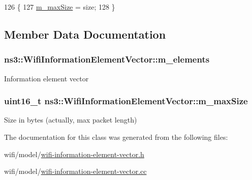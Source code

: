 \begin{DoxyCode}
126 \{
127   \hyperlink{classns3_1_1WifiInformationElementVector_ae4e269048a74f706dc50155295dcd4ad}{m\_maxSize} = size;
128 \}
\end{DoxyCode}


\subsection{Member Data Documentation}
\subsubsection[{\texorpdfstring{m\+\_\+elements}{m_elements}}]{ ns3\+::\+Wifi\+Information\+Element\+Vector\+::m\+\_\+elements\hspace{0.3cm}{\ttfamily [protected]}}\hypertarget{classns3_1_1WifiInformationElementVector_a03bf28a1640272cfa71fdd6e5bbf429e}{}\label{classns3_1_1WifiInformationElementVector_a03bf28a1640272cfa71fdd6e5bbf429e}
Information element vector 
\subsubsection[{\texorpdfstring{m\+\_\+max\+Size}{m_maxSize}}]{\setlength{\rightskip}{0pt plus 5cm}uint16\+\_\+t ns3\+::\+Wifi\+Information\+Element\+Vector\+::m\+\_\+max\+Size\hspace{0.3cm}{\ttfamily [protected]}}\hypertarget{classns3_1_1WifiInformationElementVector_ae4e269048a74f706dc50155295dcd4ad}{}\label{classns3_1_1WifiInformationElementVector_ae4e269048a74f706dc50155295dcd4ad}


Size in bytes (actually, max packet length) 



The documentation for this class was generated from the following files\+:\begin{DoxyCompactItemize}
\item 
wifi/model/\hyperlink{wifi-information-element-vector_8h}{wifi-\/information-\/element-\/vector.\+h}\item 
wifi/model/\hyperlink{wifi-information-element-vector_8cc}{wifi-\/information-\/element-\/vector.\+cc}\end{DoxyCompactItemize}
